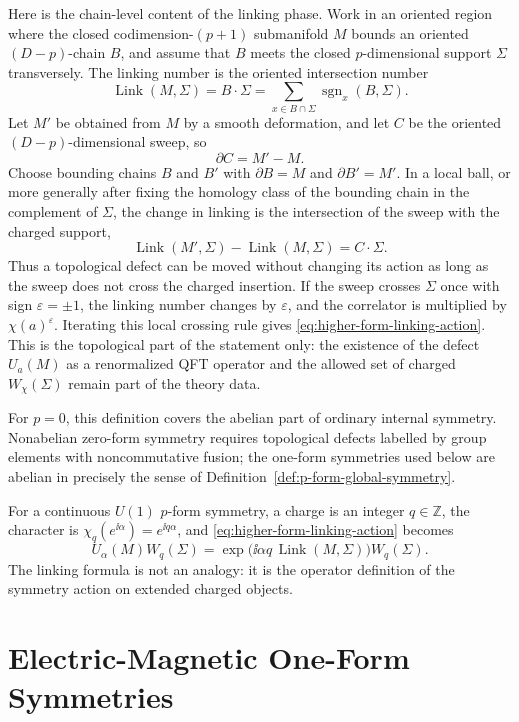 Here is the chain-level content of the linking phase.  Work in an oriented
region where the closed codimension-\((p+1)\) submanifold \(M\) bounds an
oriented \((D-p)\)-chain \(B\), and assume that \(B\) meets the closed
\(p\)-dimensional support \(\Sigma\) transversely.  The linking number is the
oriented intersection number
\begin{equation}
  \operatorname{Link}(M,\Sigma)
  =
  B\cdot\Sigma
  =
  \sum_{x\in B\cap\Sigma}\operatorname{sgn}_x(B,\Sigma).
  \label{eq:higher-form-linking-chain-intersection}
\end{equation}
Let \(M'\) be obtained from \(M\) by a smooth deformation, and let \(C\) be
the oriented \((D-p)\)-dimensional sweep, so
\[
  \partial C=M'-M .
\]
Choose bounding chains \(B\) and \(B'\) with \(\partial B=M\) and
\(\partial B'=M'\).  In a local ball, or more generally after fixing the
homology class of the bounding chain in the complement of \(\Sigma\), the
change in linking is the intersection of the sweep with the charged support,
\[
  \operatorname{Link}(M',\Sigma)-\operatorname{Link}(M,\Sigma)
  =
  C\cdot\Sigma .
\]
Thus a topological defect can be moved without changing its action as long as
the sweep does not cross the charged insertion.  If the sweep crosses
\(\Sigma\) once with sign \(\varepsilon=\pm1\), the linking number changes by
\(\varepsilon\), and the correlator is multiplied by \(\chi(a)^\varepsilon\).
Iterating this local crossing rule gives
\eqref{eq:higher-form-linking-action}.  This is the topological part of the
statement only: the existence of the defect \(U_a(M)\) as a renormalized QFT
operator and the allowed set of charged \(W_\chi(\Sigma)\) remain part of the
theory data.

For \(p=0\), this definition covers the abelian part of ordinary internal
symmetry.  Nonabelian zero-form symmetry requires topological defects labelled
by group elements with noncommutative fusion; the one-form symmetries used
below are abelian in precisely the sense of
Definition~\ref{def:p-form-global-symmetry}.

For a continuous \(U(1)\) \(p\)-form symmetry, a charge is an integer
\(q\in\mathbb Z\), the character is \(\chi_q(e^{\ii\alpha})=e^{\ii q\alpha}\),
and \eqref{eq:higher-form-linking-action} becomes
\[
  U_\alpha(M)W_q(\Sigma)
  =
  \exp\!\bigl(
    \ii\alpha q\,\operatorname{Link}(M,\Sigma)
  \bigr)W_q(\Sigma).
\]
The linking formula is not an analogy: it is the operator definition of the
symmetry action on extended charged objects.

\section{Electric-Magnetic One-Form Symmetries}

